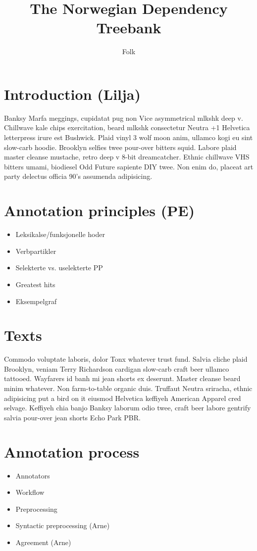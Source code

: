 \documentclass[10pt,a4paper]{article}
\title{The Norwegian Dependency Treebank}
\author{Folk}
\begin{document}
\maketitle

\section{Introduction (Lilja)}
Banksy Marfa meggings, cupidatat pug non Vice asymmetrical mlkshk deep v.
Chillwave kale chips exercitation, beard mlkshk consectetur Neutra +1
Helvetica letterpress irure est Bushwick. Plaid vinyl 3 wolf moon anim,
ullamco kogi eu sint slow-carb hoodie. Brooklyn selfies twee pour-over bitters
squid. Labore plaid master cleanse mustache, retro deep v 8-bit dreamcatcher.
Ethnic chillwave VHS bitters umami, biodiesel Odd Future sapiente DIY twee.
Non enim do, placeat art party delectus officia 90's assumenda adipisicing.

\section{Annotation principles (PE)}
\begin{itemize}
    \item Leksikalse/funksjonelle hoder
    \item Verbpartikler
    \item Selekterte vs. uselekterte PP
    \item Greatest hits
    \item Eksempelgraf
\end{itemize}

\section{Texts}
Commodo voluptate laboris, dolor Tonx whatever trust fund. Salvia cliche plaid
Brooklyn, veniam Terry Richardson cardigan slow-carb craft beer ullamco
tattooed. Wayfarers id banh mi jean shorts ex deserunt. Master cleanse beard
minim whatever. Non farm-to-table organic duis. Truffaut Neutra sriracha,
ethnic adipisicing put a bird on it eiusmod Helvetica keffiyeh American
Apparel cred selvage. Keffiyeh chia banjo Banksy laborum odio twee, craft beer
labore gentrify salvia pour-over jean shorts Echo Park PBR.

\section{Annotation process}
\begin{itemize}
    \item Annotators
    \item Workflow
    \item Preprocessing
    \item Syntactic preprocessing (Arne)
    \item Agreement (Arne)
\end{itemize}
\end{document}
